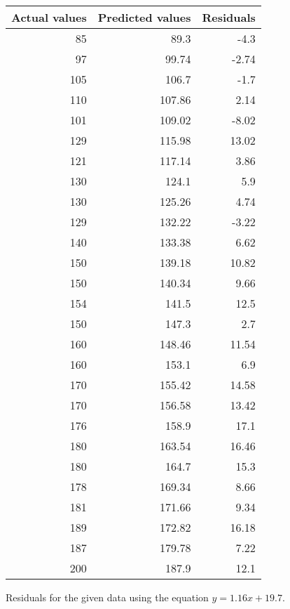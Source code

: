 \documentclass[12pt]{article}
\begin{document}
\begin{figure}[H]
    \centering
    \begin{tabular}{|r|r|r|}
        \hline
        \textbf{Actual values} & \textbf{Predicted values} & \textbf{Residuals} \\
        \hline
        85 & 89.3 & -4.3 \\
        97 & 99.74 & -2.74 \\
        105 & 106.7 & -1.7 \\
        110 & 107.86 & 2.14 \\
        101 & 109.02 & -8.02 \\
        129 & 115.98 & 13.02 \\
        121 & 117.14 & 3.86 \\
        130 & 124.1 & 5.9 \\
        130 & 125.26 & 4.74 \\
        129 & 132.22 & -3.22 \\
        140 & 133.38 & 6.62 \\
        150 & 139.18 & 10.82 \\
        150 & 140.34 & 9.66 \\
        154 & 141.5 & 12.5 \\
        150 & 147.3 & 2.7 \\
        160 & 148.46 & 11.54 \\
        160 & 153.1 & 6.9 \\
        170 & 155.42 & 14.58 \\
        170 & 156.58 & 13.42 \\
        176 & 158.9 & 17.1 \\
        180 & 163.54 & 16.46 \\
        180 & 164.7 & 15.3 \\
        178 & 169.34 & 8.66 \\
        181 & 171.66 & 9.34 \\
        189 & 172.82 & 16.18 \\
        187 & 179.78 & 7.22 \\
        200 & 187.9 & 12.1 \\
        \hline
    \end{tabular}
    \caption{Residuals for the given data using the equation $y = 1.16x + 19.7$.}
    \label{fig:residuals}
\end{figure}
\end{document}

